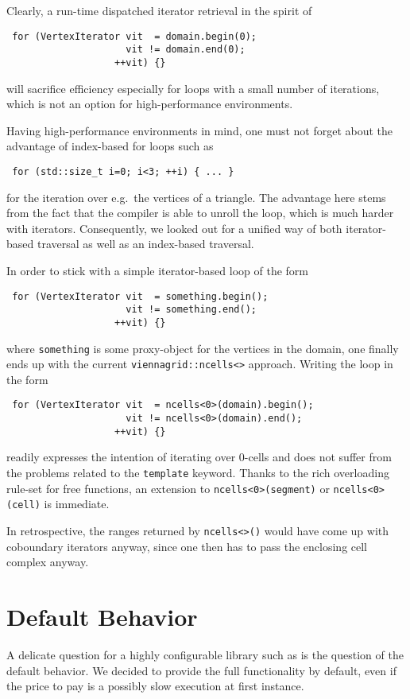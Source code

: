  Clearly, a run-time dispatched iterator retrieval in the spirit of 
 \begin{lstlisting}
 for (VertexIterator vit  = domain.begin(0);
                     vit != domain.end(0);
                   ++vit) {}
 \end{lstlisting}
 will sacrifice efficiency especially for loops with a small number of iterations, which is not an option for high-performance environments. 

 Having high-performance environments in mind, one must not forget about the advantage of index-based for loops such as 
 \begin{lstlisting}
 for (std::size_t i=0; i<3; ++i) { ... }
 \end{lstlisting}
 for the iteration over e.g.~the vertices of a triangle.
 The advantage here stems from the fact that the compiler is able to unroll the loop, which is much harder with iterators.
 Consequently, we looked out for a unified way of both iterator-based traversal as well as an index-based traversal.

 In order to stick with a simple iterator-based loop of the form
 \begin{lstlisting}
 for (VertexIterator vit  = something.begin();
                     vit != something.end();
                   ++vit) {}
 \end{lstlisting}
 where \lstinline|something| is some proxy-object for the vertices in the domain, one finally ends up with the current \lstinline|viennagrid::ncells<>| approach.
 Writing the loop in the form
 \begin{lstlisting}
 for (VertexIterator vit  = ncells<0>(domain).begin();
                     vit != ncells<0>(domain).end();
                   ++vit) {}
 \end{lstlisting}
 readily expresses the intention of iterating over $0$-cells and does not suffer from the problems related to the \lstinline|template| keyword.
 Thanks to the rich overloading rule-set for free functions, an extension to \lstinline|ncells<0>(segment)| or \lstinline|ncells<0>(cell)| is immediate.
 
 In retrospective, the ranges returned by \lstinline|ncells<>()| would have come up with coboundary iterators anyway, since one then has to pass the enclosing cell complex anyway.

 \section{Default Behavior}
 A delicate question for a highly configurable library such as {\ViennaGrid} is the question of the default behavior. 
 We decided to provide the full functionality by default, even if the price to pay is a possibly slow execution at first instance.

